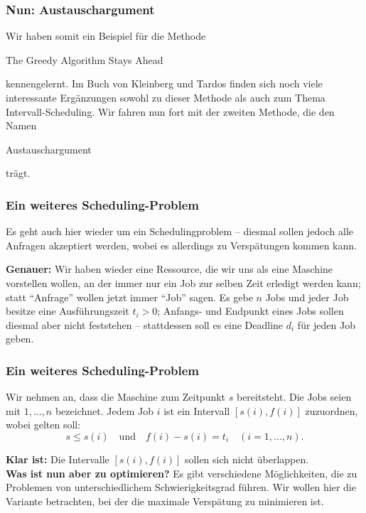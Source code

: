 \documentclass[smaller]{beamer}
\begin{document}
\begin{frame}
 \frametitle{Nun: Austauschargument}
 Wir haben somit ein Beispiel für die Methode

\begin{center}
\alert{The Greedy Algorithm Stays Ahead}
\end{center}

kennengelernt. Im Buch von Kleinberg und Tardos finden sich noch viele interessante Ergänzungen sowohl zu dieser Methode als auch zum Thema Intervall-Scheduling. Wir fahren nun fort mit der zweiten Methode, die den Namen

\begin{center}
\alert{Austauschargument}
\end{center}

trägt.
\end{frame}

\begin{frame}
 \frametitle{Ein weiteres Scheduling-Problem} 
Es geht auch hier wieder um ein Schedulingproblem -- diesmal sollen jedoch \alert{alle} Anfragen akzeptiert werden, wobei es allerdings zu \alert{Verspätungen} kommen kann. \\ \vspace*{0.2cm}

\textbf{Genauer:} Wir haben wieder eine Ressource, die wir uns als eine \alert{Maschine} vorstellen wollen, an der immer nur ein \alert{Job} zur selben Zeit erledigt werden kann; statt \enquote{Anfrage} wollen jetzt immer \enquote{Job} sagen. Es gebe $n$ Jobs und jeder Job besitze eine \alert{Ausführungszeit} $t_i > 0$; Anfangs- und Endpunkt eines Jobs sollen diesmal aber nicht feststehen -- stattdessen soll es eine \alert{Deadline} $d_i$ für jeden Job geben.
\end{frame}

\begin{frame}
 \frametitle{Ein weiteres Scheduling-Problem}
 Wir nehmen an, dass die Maschine zum Zeitpunkt $s$ bereitsteht. Die Jobs seien mit $1,\ldots,n$ bezeichnet. Jedem Job $i$ ist ein Intervall $[s(i), f(i)]$ zuzuordnen, wobei gelten soll:
\[
s \leq s(i) \quad \text{und} \quad f(i)-s(i) = t_i \quad (i=1,\ldots,n).
\]

\textbf{Klar ist:} Die Intervalle $[s(i),f(i)]$ sollen sich nicht überlappen. \\ \vspace*{0.2cm}
\textbf{Was ist nun aber zu optimieren?} Es gibt verschiedene Möglichkeiten, die zu Problemen von unterschiedlichem Schwierigkeitsgrad führen. Wir wollen hier die \alert{Variante} betrachten, \alert{bei der die maximale Verspätung zu minimieren ist}.
\end{frame}
\end{document}
